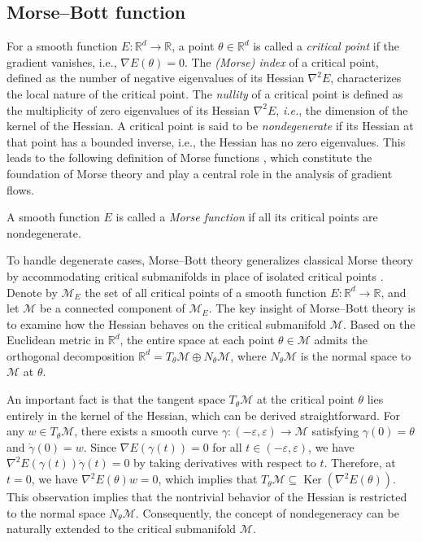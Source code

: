 \documentclass[final]{siamart251216}
\begin{document}
\subsection{Morse--Bott function}
For a smooth function $E:\mathbb{R}^d\to\mathbb{R}$, a point $\theta \in \mathbb{R}^d$ is called a \textit{critical point} if the gradient vanishes, i.e., $\nabla E(\theta) = 0$. 
The \textit{(Morse) index} of a critical point, defined as the number of negative eigenvalues of its Hessian $\nabla^2 E$, characterizes the local nature of the critical point. 
The \textit{nullity} of a critical point is defined as the multiplicity of zero eigenvalues of its Hessian $\nabla^2 E$, \textit{i.e.}, the dimension of the kernel of the Hessian. 
A critical point is said to be \textit{nondegenerate} if its Hessian at that point has a bounded inverse, i.e., the Hessian has no zero eigenvalues. 
This leads to the following definition of Morse functions \cite{milnormorse}, which constitute the foundation of Morse theory and play a central role in the analysis of gradient flows.
\begin{definition}
A smooth function $E$ is called a \emph{Morse function} if all its critical points are nondegenerate.
\end{definition}

To handle degenerate cases, Morse–Bott theory generalizes classical Morse theory by accommodating critical submanifolds in place of isolated critical points \cite{banyaga2010morse, bott1954}.
Denote by $\mathcal{M}_E$ the set of all critical points of a smooth function $E:\mathbb{R}^d\to\mathbb{R}$, and let $\mathcal{M}$ be a connected component of $\mathcal{M}_E$.
The key insight of Morse--Bott theory is to examine how the Hessian behaves on the critical submanifold $\mathcal{M}$. 
Based on the Euclidean metric in $\mathbb{R}^d$, the entire space at each point $\theta\in \mathcal{M}$ admits the orthogonal decomposition $\mathbb{R}^d=T_{\theta} \mathcal{M}\oplus N_{\theta} \mathcal{M}$, where $N_{\theta} \mathcal{M}$ is the normal space to $\mathcal{M}$ at $\theta$.


An important fact is that the tangent space $T_{\theta} \mathcal{M}$ at the critical point $\theta$ lies entirely in the kernel of the Hessian, which can be derived straightforward. 
For any ${w}\in T_{\theta} \mathcal{M}$, there exists a smooth curve $\gamma:(-\varepsilon, \varepsilon)\to \mathcal{M}$ satisfying $\gamma(0)=\theta$ and $\dot{\gamma}(0)={w}$. 
Since $\nabla E(\gamma(t))={0}$ for all $t \in (-\varepsilon, \varepsilon)$, we have $\nabla^2 E(\gamma(t))\dot{\gamma}(t) = {0}$ by taking derivatives with respect to $t$.
Therefore, at $t=0$, we have $\nabla^2 E(\theta) {w}={0}$, which implies that $T_{\theta} \mathcal{M} \subseteq \operatorname{Ker} (\nabla^2 E(\theta))$. 
This observation implies that the nontrivial behavior of the Hessian is restricted to the normal space $N_{\theta} \mathcal{M}$.  
Consequently, the concept of nondegeneracy can be naturally extended to the critical submanifold $\mathcal{M}$.
\end{document}
